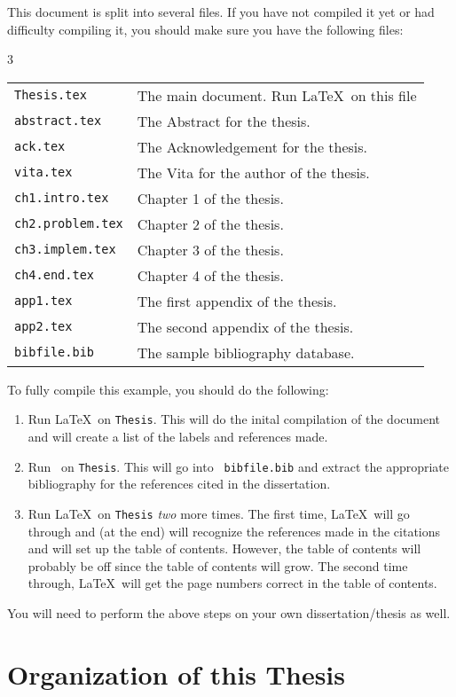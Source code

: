 This document is split into several files.  If you have not compiled
it yet or had difficulty compiling it, you should make sure you have
the following files:
%
\begin{center}3
\begin{tabular}{l l}
{\tt Thesis.tex} & The main document. Run \LaTeX\ on this file\\
{\tt abstract.tex} & The Abstract for the thesis.\\
{\tt ack.tex} & The Acknowledgement for the thesis.\\
{\tt vita.tex} & The Vita for the author of the thesis.\\
{\tt ch1.intro.tex} & Chapter 1 of the thesis.\\
{\tt ch2.problem.tex} & Chapter 2 of the thesis.\\
{\tt ch3.implem.tex} & Chapter 3 of the thesis.\\
{\tt ch4.end.tex} & Chapter 4 of the thesis.\\
{\tt app1.tex} & The first appendix of the thesis.\\
{\tt app2.tex} & The second appendix of the thesis.\\
{\tt bibfile.bib} & The sample bibliography database.
\end{tabular}
\end{center}
%

To fully compile this example, you should do the following:
%
\begin{enumerate}
\item Run \LaTeX\ on {\tt Thesis}.  This will do the inital
compilation of the document and will create a list of the labels and
references made.
%
\item Run \BibTeX\ on {\tt Thesis}.  This will go into {\tt
bibfile.bib} and extract the appropriate bibliography for the
references  cited in the dissertation.
%
\item Run \LaTeX\ on {\tt Thesis} {\em two} more times.  
The first time, \LaTeX\ will go through and (at the end) will
recognize the references made in the citations and will set up the
table of contents. However, the table of contents will probably be off
since the table of contents will grow.  The second time through,
\LaTeX\ will get the page numbers correct in the table of contents.
\end{enumerate}
%
You will need to perform the above steps on your own
dissertation/thesis as well.



\section{Organization of this Thesis}

